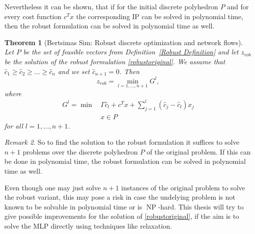 \documentclass[titlepage, a4paper]{amsbook}
\theoremstyle{plain}
\newtheorem{thm}{Theorem}[chapter]
\theoremstyle{break}
\theoremstyle{definition}
\theoremstyle{remark}
\newtheorem{rem}[thm]{Remark}
\numberwithin{equation}{thm}
\DeclareMathOperator{\NP}{NP}
\begin{document}
Nevertheless it can be shown, that if for the initial discrete polyhedron $P$ and for every cost function $c^Tx$ the corresponding IP can be solved in polynomial time, then the robust formulation can be solved in polynomial time as well.
\begin{thm}[Bertsimas Sim: Robust discrete optimization and network flows]
Let $P$ be the set of feasible vectors from Definition~\ref{Robust Definition} and let $z_{rob}$ be the solution of the robust formulation \eqref{robustoriginal}.
We assume that $\hat{c}_1 \geq \hat{c}_2 \geq \ldots \geq \hat{c}_n$ and we set $\hat{c}_{n+1}=0$. Then 
\[z_{rob}= \min_{l=1, \ldots, n+1} G^l,\]
where 
\begin{equation}
    \begin{split}
        G^l=\min\, &\Gamma \hat{c}_l + c^Tx + \sum_{j=1}^{l} (\hat{c}_j -\hat{c}_l)x_j \\
        &x \in P
    \end{split}
\end{equation}
for all $l=1, \ldots, n+1$.
\end{thm}
\begin{rem}
So to find the solution to the robust formulation it suffices to solve $n+1$ problems over the discrete polyhedron $P$ of the original problem. If this can be done in polynomial time, the robust formulation can be solved in polynomial time as well.
\end{rem}
Even though one may just solve $n+1$ instances of the original problem to solve the robust variant, this may pose a risk in case the undelying problem is not known to be solvable in polynomial time or is $\NP$-hard.
This thesis will try to give possible improvements for the solution of \eqref{robustoriginal}, if the aim is to solve the MLP directly using techniques like relaxation.
\end{document}
